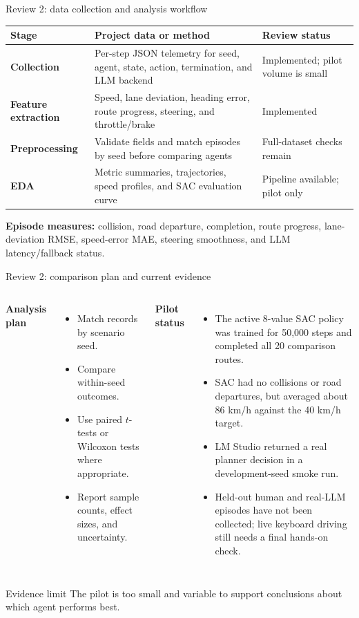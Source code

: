 \documentclass[aspectratio=169,10pt]{beamer}
\begin{document}
\begin{frame}{Review 2: data collection and analysis workflow}
\small
\begin{tabularx}{\textwidth}{>{\bfseries}p{} X X}
\toprule
Stage & Project data or method & Review status \\
\midrule
Collection & Per-step JSON telemetry for seed, agent, state, action, termination, and LLM backend & Implemented; pilot volume is small \\
Feature extraction & Speed, lane deviation, heading error, route progress, steering, and throttle/brake & Implemented \\
Preprocessing & Validate fields and match episodes by seed before comparing agents & Full-dataset checks remain \\
EDA & Metric summaries, trajectories, speed profiles, and SAC evaluation curve & Pipeline available; pilot only \\
\bottomrule
\end{tabularx}
\vspace{0.6em}
\textbf{Episode measures:} collision, road departure, completion, route progress, lane-deviation RMSE, speed-error MAE, steering smoothness, and LLM latency/fallback status.
\end{frame}

\begin{frame}{Review 2: comparison plan and current evidence}
\begin{columns}[T]
\textbf{Analysis plan}
\begin{itemize}
  \item Match records by scenario seed.
  \item Compare within-seed outcomes.
  \item Use paired $t$-tests or Wilcoxon tests where appropriate.
  \item Report sample counts, effect sizes, and uncertainty.
\end{itemize}
\textbf{Pilot status}
\begin{itemize}
  \item The active 8-value SAC policy was trained for 50,000 steps and completed all 20 comparison routes.
  \item SAC had no collisions or road departures, but averaged about 86 km/h against the 40 km/h target.
  \item LM Studio returned a real planner decision in a development-seed smoke run.
  \item Held-out human and real-LLM episodes have not been collected; live keyboard driving still needs a final hands-on check.
\end{itemize}
\end{columns}
\begin{alertblock}{Evidence limit}
The pilot is too small and variable to support conclusions about which agent performs best.
\end{alertblock}
\end{frame}
\end{document}
